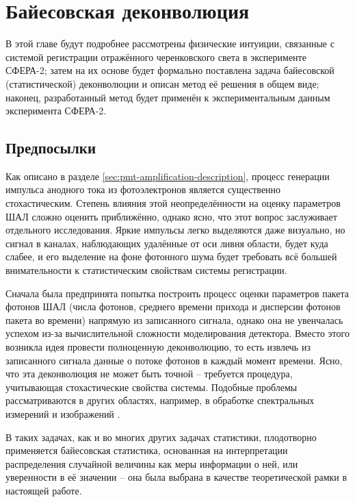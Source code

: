 \documentclass[12pt]{book}
\begin{document}

	\chapter{Байесовская деконволюция}
	
	\label{chapt:bayesian-deconvolution}
	
	В этой главе будут подробнее рассмотрены физические интуиции, связанные с системой регистрации отражённого черенковского света в эксперименте СФЕРА-2; затем на их основе будет формально поставлена задача байесовской (статистической) деконволюции и описан метод её решения в общем виде; наконец, разработанный метод будет применён к экспериментальным данным эксперимента СФЕРА-2.
	
	\section{Предпосылки}
	
	Как описано в разделе \ref{sec:pmt-amplification-description}, процесс генерации импульса анодного тока из фотоэлектронов является существенно стохастическим. Степень влияния этой неопределённости на оценку параметров ШАЛ сложно оценить приближённо, однако ясно, что этот вопрос заслуживает отдельного исследования. Яркие импульсы легко выделяются даже визуально, но сигнал в каналах, наблюдающих удалённые от оси ливня области, будет куда слабее, и его выделение на фоне фотонного шума будет требовать всё большей внимательности к статистическим свойствам системы регистрации.
	
	Сначала была предпринята попытка построить процесс оценки параметров пакета фотонов ШАЛ (числа фотонов, среднего времени прихода и дисперсии фотонов пакета во времени) напрямую из записанного сигнала, однако она не увенчалась успехом из-за вычислительной сложности моделирования детектора. Вместо этого возникла идея провести полноценную деконволюцию, то есть извлечь из записанного сигнала данные о потоке фотонов в каждый момент времени. Ясно, что эта деконволюция не может быть точной -- требуется процедура, учитывающая стохастические свойства системы. Подобные проблемы рассматриваются в других областях, например, в обработке спектральных измерений \cite{Rhode1993} и изображений \cite{Wipf2013}.
	
	В таких задачах, как и во многих других задачах статистики, плодотворно применяется байесовская статистика, основанная на интерпретации распределения случайной величины как меры информации о ней, или уверенности в её значении \cite{Gelman2013} -- она была выбрана в качестве теоретической рамки в настоящей работе.
	
\end{document}

